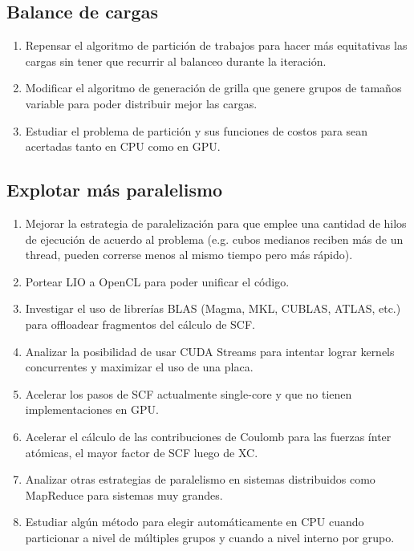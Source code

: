 \subsection*{Balance de cargas}
\begin{enumerate}
  \item Repensar el algoritmo de partici\'on de trabajos para hacer m\'as equitativas las cargas sin
    tener que recurrir al balanceo durante la iteraci\'on.
  \item Modificar el algoritmo de generaci\'on de grilla que genere grupos de tama\~nos variable para poder
    distribuir mejor las cargas.
  \item Estudiar el problema de partici\'on y sus funciones de costos para sean acertadas tanto en CPU
    como en GPU.
\end{enumerate}

\subsection*{Explotar m\'as paralelismo}
\begin{enumerate}
  \item Mejorar la estrategia de paralelizaci\'on para que emplee una cantidad de
  hilos de ejecuci\'on de acuerdo al problema (e.g. cubos medianos reciben m\'as
  de un thread, pueden correrse menos al mismo tiempo pero m\'as r\'apido).
  \item Portear LIO a OpenCL para poder unificar el c\'odigo.
  \item Investigar el uso de librer\'ias BLAS (Magma, MKL, CUBLAS, ATLAS, etc.) para offloadear fragmentos del
    c\'alculo de SCF.
  \item Analizar la posibilidad de usar CUDA Streams para intentar lograr kernels concurrentes y maximizar
    el uso de una placa.
  \item Acelerar los pasos de SCF actualmente single-core y que no tienen implementaciones en GPU.
  \item Acelerar el c\'alculo de las contribuciones de Coulomb para las fuerzas \'inter at\'omicas, el mayor factor de SCF luego de XC.
  \item Analizar otras estrategias de paralelismo en sistemas distribuidos como MapReduce para sistemas muy grandes.
  \item Estudiar alg\'un m\'etodo para elegir autom\'aticamente en CPU cuando particionar a nivel
    de m\'ultiples grupos y cuando a nivel interno por grupo.
\end{enumerate}

